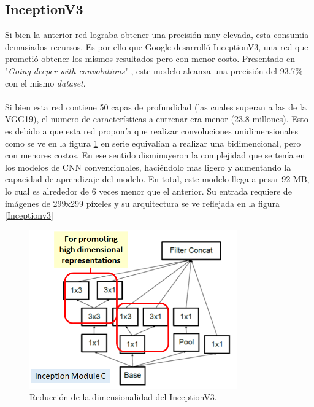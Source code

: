 \subsection{InceptionV3}
Si bien la anterior red lograba obtener una precisión muy elevada, esta consumía demasiados recursos. Es por ello que Google desarrolló InceptionV3, una red que prometió obtener los mismos resultados pero con menor costo. Presentado en "\textit{Going deeper with convolutions}" \cite{Szegedy2014}, este modelo alcanza una precisión del 93.7\% con el mismo \textit{dataset}. \\\\
Si bien esta red contiene 50 capas de profundidad (las cuales superan a las de la VGG19), el numero de características a entrenar era menor (23.8 millones). Esto es debido a que esta red proponía que realizar convoluciones unidimensionales como se ve en la figura \ref{InceptionLayer} en serie equivalían a realizar una bidimencional, pero con menores costos. En ese sentido disminuyeron la complejidad que se tenía en los modelos de CNN convencionales, haciéndolo mas ligero y aumentando la capacidad de aprendizaje del modelo. En total, este modelo llega a pesar 92 MB, lo cual es alrededor de 6 veces menor que el anterior. Su entrada requiere de imágenes de 299x299 píxeles y su arquitectura se ve reflejada en la figura \ref{Inceptionv3}

\begin{figure}[h!]
\includegraphics[width=0.8\textwidth]{images/InceptionLayer.png}
\centering
\caption{Reducción de la dimensionalidad del InceptionV3. \protect\cite{modelos} }
\label{InceptionLayer}
\end{figure}

